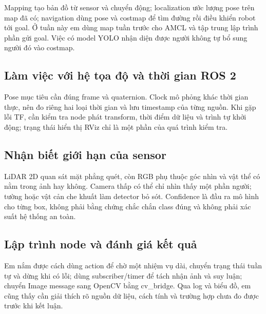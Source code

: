 \documentclass[a4paper,11pt]{article}
\begin{document}
Mapping tạo bản đồ từ sensor và chuyển động; localization ước lượng pose trên map
đã có; navigation dùng pose và costmap để tìm đường rồi điều khiển robot tới goal.
Ở tuần này em dùng map tuần trước cho AMCL và tập trung lập trình phần gửi goal.
Việc có model YOLO nhận diện được người không tự bổ sung người đó vào costmap.

\subsection{Làm việc với hệ tọa độ và thời gian ROS 2}

Pose mục tiêu cần đúng frame và quaternion. Clock mô phỏng khác thời gian thực,
nên đo riêng hai loại thời gian và lưu timestamp của từng nguồn. Khi gặp lỗi TF,
cần kiểm tra node phát transform, thời điểm dữ liệu và trình tự khởi động; trạng thái
hiển thị RViz chỉ là một phần của quá trình kiểm tra.

\subsection{Nhận biết giới hạn của sensor}

LiDAR 2D quan sát mặt phẳng quét, còn RGB phụ thuộc góc nhìn và vật thể có nằm
trong ảnh hay không. Camera thấp có thể chỉ nhìn thấy một phần người; tường hoặc
vật cản che khuất làm detector bỏ sót. Confidence là đầu ra mô hình cho từng box,
không phải bằng chứng chắc chắn class đúng và không phải xác suất hệ thống an toàn.

\subsection{Lập trình node và đánh giá kết quả}

Em nắm được cách dùng action để chờ một nhiệm vụ dài, chuyển trạng thái tuần tự
và dừng khi có lỗi; dùng subscriber/timer để tách nhận ảnh và suy luận; chuyển
Image message sang OpenCV bằng cv\_bridge. Qua log và biểu đồ, em cũng thấy cần
giải thích rõ nguồn dữ liệu, cách tính và trường hợp chưa đo được trước khi kết luận.
\end{document}
